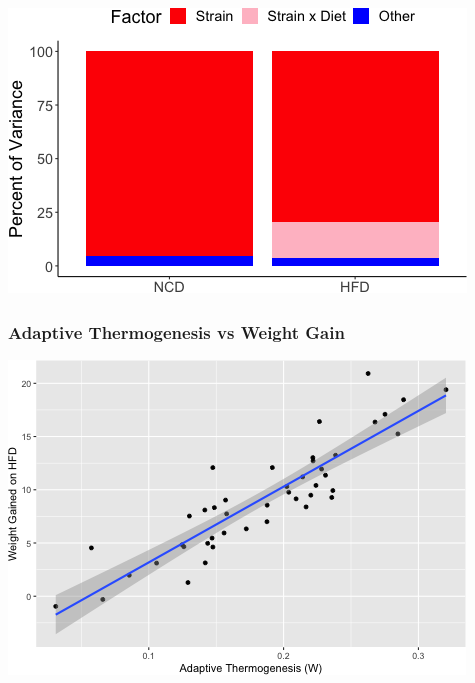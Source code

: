 \documentclass[]{article}
\newenvironment{Shaded}{\begin{snugshade}}{\end{snugshade}}
\newcommand{\DataTypeTok}[1]{\textcolor[rgb]{0.13,0.29,0.53}{#1}}
\newcommand{\KeywordTok}[1]{\textcolor[rgb]{0.13,0.29,0.53}{\textbf{#1}}}
\newcommand{\NormalTok}[1]{#1}
\newcommand{\OperatorTok}[1]{\textcolor[rgb]{0.81,0.36,0.00}{\textbf{#1}}}
\newcommand{\StringTok}[1]{\textcolor[rgb]{0.31,0.60,0.02}{#1}}
\begin{document}
\includegraphics{figures/sim-data-1.png}

\hypertarget{adaptive-thermogenesis-vs-weight-gain}{%
\subsubsection{Adaptive Thermogenesis vs Weight
Gain}\label{adaptive-thermogenesis-vs-weight-gain}}

\begin{Shaded}
\end{Shaded}

\includegraphics{figures/adaptive-thermogenesis-weight-1.png}
\end{document}
